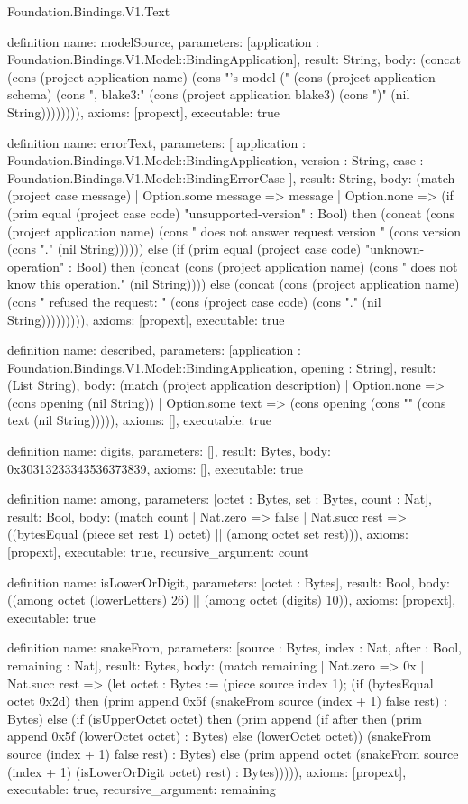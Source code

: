 \begin{lexlean}{Foundation.Bindings.V1.Text}
\begin{semanticmodule}
definition{
  name: modelSource,
  parameters: [application : Foundation.Bindings.V1.Model::BindingApplication],
  result: String,
  body: (concat (cons (project application name) (cons "'s model (" (cons (project application schema) (cons ", blake3:" (cons (project application blake3) (cons ")" (nil String)))))))),
  axioms: [propext],
  executable: true
}

definition{
  name: errorText,
  parameters: [
    application : Foundation.Bindings.V1.Model::BindingApplication,
    version : String,
    case : Foundation.Bindings.V1.Model::BindingErrorCase
  ],
  result: String,
  body: (match (project case message)
    | Option.some message => message
    | Option.none => (if (prim equal (project case code) "unsupported-version" : Bool) then (concat (cons (project application name) (cons " does not answer request version " (cons version (cons "." (nil String)))))) else (if (prim equal (project case code) "unknown-operation" : Bool) then (concat (cons (project application name) (cons " does not know this operation." (nil String)))) else (concat (cons (project application name) (cons " refused the request: " (cons (project case code) (cons "." (nil String))))))))),
  axioms: [propext],
  executable: true
}

definition{
  name: described,
  parameters: [application : Foundation.Bindings.V1.Model::BindingApplication, opening : String],
  result: (List String),
  body: (match (project application description)
    | Option.none => (cons opening (nil String))
    | Option.some text => (cons opening (cons "" (cons text (nil String))))),
  axioms: [],
  executable: true
}

definition{
  name: digits,
  parameters: [],
  result: Bytes,
  body: 0x30313233343536373839,
  axioms: [],
  executable: true
}

definition{
  name: among,
  parameters: [octet : Bytes, set : Bytes, count : Nat],
  result: Bool,
  body: (match count
    | Nat.zero => false
    | Nat.succ rest => ((bytesEqual (piece set rest 1) octet) || (among octet set rest))),
  axioms: [propext],
  executable: true,
  recursive_argument: count
}

definition{
  name: isLowerOrDigit,
  parameters: [octet : Bytes],
  result: Bool,
  body: ((among octet (lowerLetters) 26) || (among octet (digits) 10)),
  axioms: [propext],
  executable: true
}

definition{
  name: snakeFrom,
  parameters: [source : Bytes, index : Nat, after : Bool, remaining : Nat],
  result: Bytes,
  body: (match remaining
    | Nat.zero => 0x
    | Nat.succ rest => (let octet : Bytes := (piece source index 1); (if (bytesEqual octet 0x2d) then (prim append 0x5f (snakeFrom source (index + 1) false rest) : Bytes) else (if (isUpperOctet octet) then (prim append (if after then (prim append 0x5f (lowerOctet octet) : Bytes) else (lowerOctet octet)) (snakeFrom source (index + 1) false rest) : Bytes) else (prim append octet (snakeFrom source (index + 1) (isLowerOrDigit octet) rest) : Bytes))))),
  axioms: [propext],
  executable: true,
  recursive_argument: remaining
}


\end{semanticmodule}
\end{lexlean}
